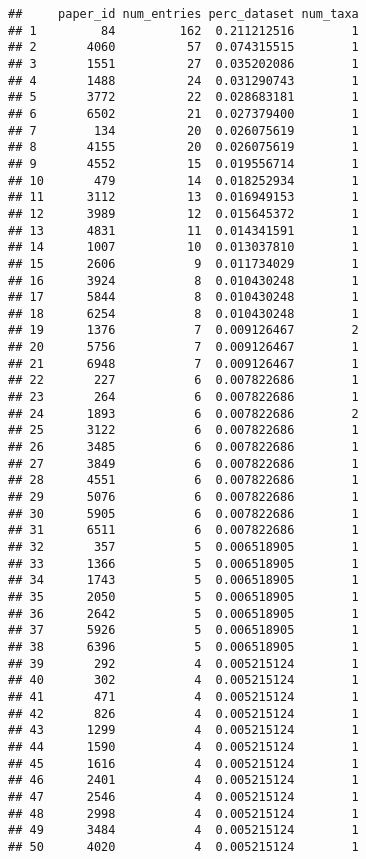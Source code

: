 \documentclass[
]{article}
\begin{document}
\begin{verbatim}
##     paper_id num_entries perc_dataset num_taxa
## 1         84         162  0.211212516        1
## 2       4060          57  0.074315515        1
## 3       1551          27  0.035202086        1
## 4       1488          24  0.031290743        1
## 5       3772          22  0.028683181        1
## 6       6502          21  0.027379400        1
## 7        134          20  0.026075619        1
## 8       4155          20  0.026075619        1
## 9       4552          15  0.019556714        1
## 10       479          14  0.018252934        1
## 11      3112          13  0.016949153        1
## 12      3989          12  0.015645372        1
## 13      4831          11  0.014341591        1
## 14      1007          10  0.013037810        1
## 15      2606           9  0.011734029        1
## 16      3924           8  0.010430248        1
## 17      5844           8  0.010430248        1
## 18      6254           8  0.010430248        1
## 19      1376           7  0.009126467        2
## 20      5756           7  0.009126467        1
## 21      6948           7  0.009126467        1
## 22       227           6  0.007822686        1
## 23       264           6  0.007822686        1
## 24      1893           6  0.007822686        2
## 25      3122           6  0.007822686        1
## 26      3485           6  0.007822686        1
## 27      3849           6  0.007822686        1
## 28      4551           6  0.007822686        1
## 29      5076           6  0.007822686        1
## 30      5905           6  0.007822686        1
## 31      6511           6  0.007822686        1
## 32       357           5  0.006518905        1
## 33      1366           5  0.006518905        1
## 34      1743           5  0.006518905        1
## 35      2050           5  0.006518905        1
## 36      2642           5  0.006518905        1
## 37      5926           5  0.006518905        1
## 38      6396           5  0.006518905        1
## 39       292           4  0.005215124        1
## 40       302           4  0.005215124        1
## 41       471           4  0.005215124        1
## 42       826           4  0.005215124        1
## 43      1299           4  0.005215124        1
## 44      1590           4  0.005215124        1
## 45      1616           4  0.005215124        1
## 46      2401           4  0.005215124        1
## 47      2546           4  0.005215124        1
## 48      2998           4  0.005215124        1
## 49      3484           4  0.005215124        1
## 50      4020           4  0.005215124        1

\end{verbatim}
\end{document}
